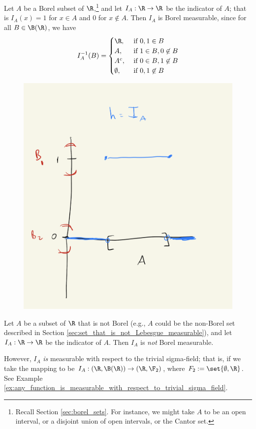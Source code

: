 \documentclass{article} %
\begin{document}
\begin{example}{}
Let $A$ be a Borel subset of $\R$,\footnote{Recall Section \ref{sec:borel_sets}.  For instance, we might take $A$ to be an open interval, or a disjoint union of open intervals, or the Cantor set.} and let $I_A : \R \to \R$ be the indicator of $A$; that is $I_A(x)=1$ for $x \in A$ and $0$ for $x \not\in A$. Then $I_A$ is Borel measurable, since for all $B \in \B(\R)$, we have
\[ I_A^{-1}(B) = 
\begin{cases}
\R, & \text{ if } 0,1 \in B\\ 
A, & \text{ if } 1 \in B, 0 \not\in B \\
A^c, & \text{ if } 0 \in B, 1 \not\in B \\	
\emptyset, & \text{ if } 0,1 \not\in B\\ 
\end{cases}
\]

\begin{figure}[H]
\centering
\includegraphics[width=.4\textwidth]{images/indicator_of_borel_set}	
\end{figure}

\end{example}

\begin{example}{}
Let $A$ be a subset of $\R$ that is not Borel (e.g., $A$ could be the non-Borel set described in Section \ref{sec:set_that_is_not_Lebesgue_measurable}), and let $I_A : \R \to \R$ be the indicator of $A$.   Then $I_A$ is \textit{not} Borel measurable.  

However, $I_A$  \textit{is} measurable with respect to the trivial sigma-field; that is, if we take the mapping to be $I_A : (\R, \B(\R)) \to (\R, \F_2)$, where $F_2 := \set{\emptyset, \R}$.  See Example \ref{ex:any_function_is_measurable_with_respect_to_trivial_sigma_field}.
\label{ex:indicators_of_non_borel_sets_are_not_borel_measurable}
\end{example}
\end{document}
